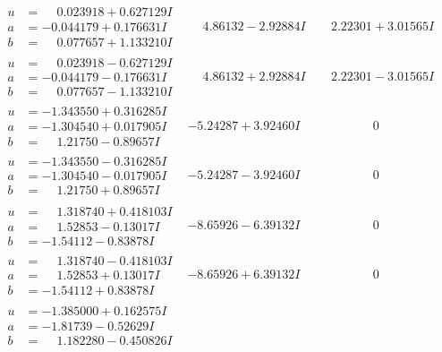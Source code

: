 \documentclass[1p]{elsarticle_modified}
\theoremstyle{definition}
\begin{document}
$$\begin{array}{c|c|c}
\begin{aligned}
u &= \phantom{-}0.023918 + 0.627129 I \\
a &= -0.044179 + 0.176631 I \\
b &= \phantom{-}0.077657 + 1.133210 I\end{aligned}
 & \phantom{-}4.86132 - 2.92884 I & \phantom{-}2.22301 + 3.01565 I \\ \hline\begin{aligned}
u &= \phantom{-}0.023918 - 0.627129 I \\
a &= -0.044179 - 0.176631 I \\
b &= \phantom{-}0.077657 - 1.133210 I\end{aligned}
 & \phantom{-}4.86132 + 2.92884 I & \phantom{-}2.22301 - 3.01565 I \\ \hline\begin{aligned}
u &= -1.343550 + 0.316285 I \\
a &= -1.304540 + 0.017905 I \\
b &= \phantom{-}1.21750 - 0.89657 I\end{aligned}
 & -5.24287 + 3.92460 I & \phantom{-0.000000 } 0 \\ \hline\begin{aligned}
u &= -1.343550 - 0.316285 I \\
a &= -1.304540 - 0.017905 I \\
b &= \phantom{-}1.21750 + 0.89657 I\end{aligned}
 & -5.24287 - 3.92460 I & \phantom{-0.000000 } 0 \\ \hline\begin{aligned}
u &= \phantom{-}1.318740 + 0.418103 I \\
a &= \phantom{-}1.52853 - 0.13017 I \\
b &= -1.54112 - 0.83878 I\end{aligned}
 & -8.65926 - 6.39132 I & \phantom{-0.000000 } 0 \\ \hline\begin{aligned}
u &= \phantom{-}1.318740 - 0.418103 I \\
a &= \phantom{-}1.52853 + 0.13017 I \\
b &= -1.54112 + 0.83878 I\end{aligned}
 & -8.65926 + 6.39132 I & \phantom{-0.000000 } 0 \\ \hline\begin{aligned}
u &= -1.385000 + 0.162575 I \\
a &= -1.81739 - 0.52629 I \\
b &= \phantom{-}1.182280 - 0.450826 I\end{aligned}

\end{array}$$
\end{document}
